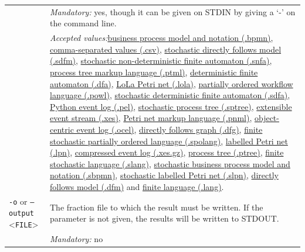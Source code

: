 {\begin{tabularx}{\linewidth}{lX}
&\textit{Mandatory:} \quad yes, though it can be given on STDIN by giving a `-' on the command line.\\
&\textit{Accepted values:}\quad \hyperref[filehandler:business process model and notation]{business process model and notation (.bpmn)}, \hyperref[filehandler:comma-separated values]{comma-separated values (.csv)}, \hyperref[filehandler:stochastic directly follows model]{stochastic directly follows model (.sdfm)}, \hyperref[filehandler:stochastic non-deterministic finite automaton]{stochastic non-deterministic finite automaton (.snfa)}, \hyperref[filehandler:process tree markup language]{process tree markup language (.ptml)}, \hyperref[filehandler:deterministic finite automaton]{deterministic finite automaton (.dfa)}, \hyperref[filehandler:LoLa Petri net]{LoLa Petri net (.lola)}, \hyperref[filehandler:partially ordered workflow language]{partially ordered workflow language (.powl)}, \hyperref[filehandler:stochastic deterministic finite automaton]{stochastic deterministic finite automaton (.sdfa)}, \hyperref[filehandler:Python event log]{Python event log (.pel)}, \hyperref[filehandler:stochastic process tree]{stochastic process tree (.sptree)}, \hyperref[filehandler:extensible event stream]{extensible event stream (.xes)}, \hyperref[filehandler:Petri net markup language]{Petri net markup language (.pnml)}, \hyperref[filehandler:object-centric event log]{object-centric event log (.ocel)}, \hyperref[filehandler:directly follows graph]{directly follows graph (.dfg)}, \hyperref[filehandler:finite stochastic partially ordered language]{finite stochastic partially ordered language (.spolang)}, \hyperref[filehandler:labelled Petri net]{labelled Petri net (.lpn)}, \hyperref[filehandler:compressed event log]{compressed event log (.xes.gz)}, \hyperref[filehandler:process tree]{process tree (.ptree)}, \hyperref[filehandler:finite stochastic language]{finite stochastic language (.slang)}, \hyperref[filehandler:stochastic business process model and notation]{stochastic business process model and notation (.sbpmn)}, \hyperref[filehandler:stochastic labelled Petri net]{stochastic labelled Petri net (.slpn)}, \hyperref[filehandler:directly follows model]{directly follows model (.dfm)} and \hyperref[filehandler:finite language]{finite language (.lang)}.\\
\texttt{-o} or \texttt{--output} <\texttt{FILE}> &
The fraction file to which the result must be written. If the parameter is not given, the results will be written to STDOUT.\\
&\textit{Mandatory:} \quad no\\

\end{tabularx}}
